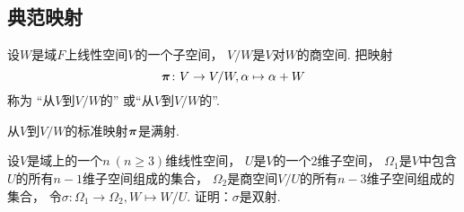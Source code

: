\subsection{典范映射}
\begin{definition}
设\(W\)是域\(F\)上线性空间\(V\)的一个子空间，
\(V/W\)是\(V\)对\(W\)的商空间.
把映射\begin{equation*}
	\boldsymbol\pi\colon V \to V/W,
	\alpha \mapsto \alpha+W
\end{equation*}称为
“从\(V\)到\(V/W\)的”
或“从\(V\)到\(V/W\)的”.
\end{definition}

\begin{proposition}
从\(V\)到\(V/W\)的标准映射\(\boldsymbol\pi\)是满射.
\end{proposition}

\begin{example}
设\(V\)是域上的一个\(n\ (n\geq3)\)维线性空间，
\(U\)是\(V\)的一个2维子空间，
\(\Omega_1\)是\(V\)中包含\(U\)的所有\(n-1\)维子空间组成的集合，
\(\Omega_2\)是商空间\(V/U\)的所有\(n-3\)维子空间组成的集合，
令\(\sigma\colon \Omega_1 \to \Omega_2, W \mapsto W/U\).
证明：\(\sigma\)是双射.
\end{example}
